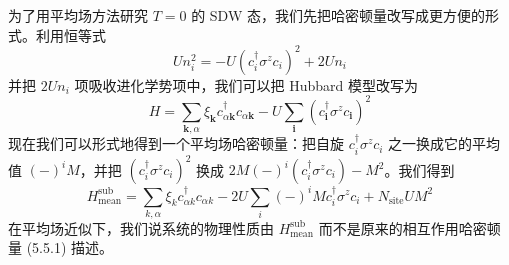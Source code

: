 为了用平均场方法研究 $T=0$ 的 SDW 态，我们先把哈密顿量改写成更方便的形式。利用恒等式
\begin{equation*}
Un^{2}_{i}=-U(c^{\dagger}_{i}\sigma^{z}c_{i})^{2}+2Un_{i}
\end{equation*}
并把 $2Un_{i}$ 项吸收进化学势项中，我们可以把 Hubbard 模型改写为
\begin{equation*}
H=\sum_{\pmb{k},\alpha}\xi_{\pmb{k}}c^{\dagger}_{\alpha\pmb{k}}c_{\alpha\pmb{k}}-U\sum_{\pmb{i}}(c^{\dagger}_{\pmb{i}}\sigma^{z}c_{\pmb{i}})^{2}
\end{equation*}
现在我们可以形式地得到一个平均场哈密顿量：把自旋 $c^{\dagger}_{i}\sigma^{z}c_{i}$ 之一换成它的平均值 $(-)^{i}M$，并把 $(c^{\dagger}_{i}\sigma^{z}c_{i})^{2}$ 换成 $2M(-)^{i}(c^{\dagger}_{i}\sigma^{z}c_{i})-M^{2}$。我们得到
\begin{equation*}
H^{\mathrm{sub}}_{\mathrm{mean}}=\sum_{k,\alpha}\xi_{k}c^{\dagger}_{\alpha k}c_{\alpha k}-2U\sum_{i}(-)^{i}Mc^{\dagger}_{i}\sigma^{z}c_{i}+N_{\mathrm{site}}UM^{2}
\end{equation*}
在平均场近似下，我们说系统的物理性质由 $H^{\mathrm{sub}}_{\mathrm{mean}}$ 而不是原来的相互作用哈密顿量 (5.5.1) 描述。

